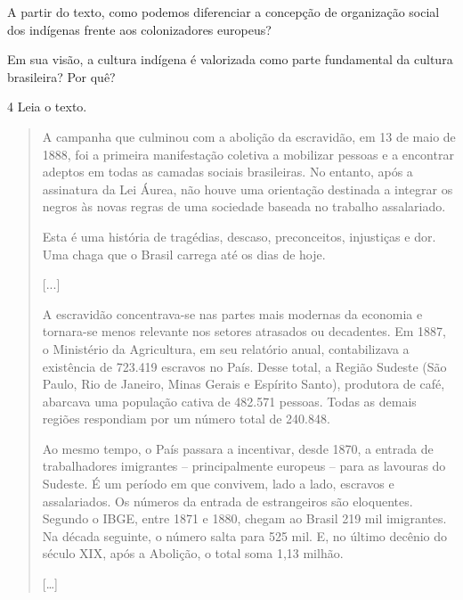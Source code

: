 \begin{escolha}
\item A partir do texto, como podemos diferenciar a concepção de
organização social dos indígenas frente aos colonizadores europeus?


\item Em sua visão, a cultura indígena é valorizada como parte fundamental
da cultura brasileira? Por quê?

\end{escolha}

\num{4} Leia o texto.

\begin{quote}
A campanha que culminou com a abolição da escravidão, em 13 de maio de
1888, foi a primeira manifestação coletiva a mobilizar pessoas e a
encontrar adeptos em todas as camadas sociais brasileiras. No entanto,
após a assinatura da Lei Áurea, não houve uma orientação destinada a
integrar os negros às novas regras de uma sociedade baseada no trabalho
assalariado.

Esta é uma história de tragédias, descaso, preconceitos, injustiças e
dor. Uma chaga que o Brasil carrega até os dias de hoje.

{[}...{]}

A escravidão concentrava-se nas partes mais modernas da economia e
tornara-se menos relevante nos setores atrasados ou decadentes. Em 1887,
o Ministério da Agricultura, em seu relatório anual, contabilizava a
existência de 723.419 escravos no País. Desse total, a Região Sudeste
(São Paulo, Rio de Janeiro, Minas Gerais e Espírito Santo), produtora de
café, abarcava uma população cativa de 482.571 pessoas. Todas as demais
regiões respondiam por um número total de 240.848.

Ao mesmo tempo, o País passara a incentivar, desde 1870, a entrada de
trabalhadores imigrantes -- principalmente europeus -- para as lavouras
do Sudeste. É um período em que convivem, lado a lado, escravos e
assalariados. Os números da entrada de estrangeiros são eloquentes.
Segundo o IBGE, entre 1871 e 1880, chegam ao Brasil 219 mil imigrantes.
Na década seguinte, o número salta para 525 mil. E, no último decênio do
século XIX, após a Abolição, o total soma 1,13 milhão.

{[}\ldots{}{]}

\end{quote}

